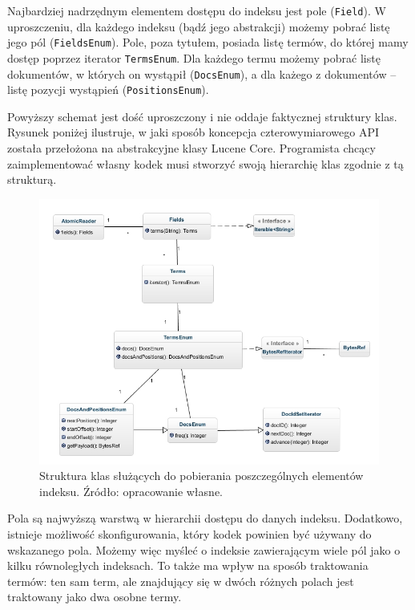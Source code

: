 Najbardziej nadrzędnym elementem dostępu do indeksu jest pole (\texttt{Field}). W uproszczeniu, dla każdego indeksu (bądź jego abstrakcji) możemy pobrać listę jego pól (\texttt{FieldsEnum}). Pole, poza tytułem, posiada listę termów, do której mamy dostęp poprzez iterator \texttt{TermsEnum}. Dla każdego termu możemy pobrać listę dokumentów, w których on wystąpił (\texttt{DocsEnum}), a dla każego z dokumentów -- listę pozycji wystąpień (\texttt{PositionsEnum}).

Powyższy schemat jest dość uproszczony i nie oddaje faktycznej struktury klas. Rysunek poniżej ilustruje, w jaki sposób koncepcja czterowymiarowego API została przełożona na abstrakcyjne klasy Lucene Core. Programista chcący zaimplementować własny kodek musi stworzyć swoją hierarchię klas zgodnie z tą strukturą.

\begin{figure}[here]
 \label{indexApi}
 \includegraphics[scale=0.6]{LuceneAccessAPI.jpg}
 \caption{Struktura klas służących do pobierania poszczególnych elementów indeksu. Źródło: opracowanie własne.}
\end{figure}

Pola są najwyższą warstwą w hierarchii dostępu do danych indeksu. Dodatkowo, istnieje możliwość skonfigurowania, który kodek powinien być używany do wskazanego pola. Możemy więc myśleć o indeksie zawierającym wiele pól jako o kilku równoległych indeksach. To także ma wpływ na sposób traktowania termów: ten sam term, ale znajdujący się w dwóch różnych polach jest traktowany jako dwa osobne termy. 

